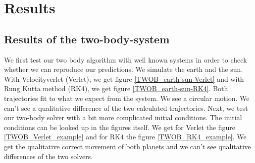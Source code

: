 \documentclass[10pt,a4paper]{article}
\begin{document}
\section{Results}

\subsection{Results of the two-body-system}

We first test our two body algorithm with well known systems in order to check whether we can reproduce our predictions. We simulate the earth and the sun. With Velocityverlet (Verlet), we get figure \ref{TWOB_earth-sun-Verlet} and with Rung Kutta method (RK4), we get figure \ref{TWOB_earth-sun-RK4}. Both trajectories fit to what we expect from the system. We see a circular motion. We can't see a qualitative difference of the two calculated trajectories. 
Next, we test our two-body solver with a bit more complicated initial conditions. The initial conditions can be looked up in the figures itself. We get for Verlet the figure \ref{TWOB_Verlet_example} and for RK4 the figure \ref{TWOB_RK4_example}. We get the qualitative correct movement of both planets and we can't see qualitative differences of the two solvers. 
\end{document}
